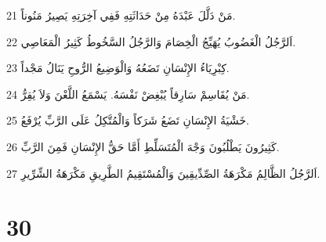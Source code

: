 \par 21 مَنْ دَلَّلَ عَبْدَهُ مِنْ حَدَاثَتِهِ فَفِي آخِرَتِهِ يَصِيرُ مَنُوناً.
\par 22 اَلرَّجُلُ الْغَضُوبُ يُهَيِّجُ الْخِصَامَ وَالرَّجُلُ السَّخُوطُ كَثِيرُ الْمَعَاصِي.
\par 23 كِبْرِيَاءُ الإِنْسَانِ تَضَعُهُ وَالْوَضِيعُ الرُّوحِ يَنَالُ مَجْداً.
\par 24 مَنْ يُقَاسِمْ سَارِقاً يُبْغِضْ نَفْسَهُ. يَسْمَعُ اللَّعْنَ وَلاَ يُقِرُّ.
\par 25 خَشْيَةُ الإِنْسَانِ تَضَعُ شَرَكاً وَالْمُتَّكِلُ عَلَى الرَّبِّ يُرْفَعُ.
\par 26 كَثِيرُونَ يَطْلُبُونَ وَجْهَ الْمُتَسَلِّطِ أَمَّا حَقُّ الإِنْسَانِ فَمِنَ الرَّبِّ.
\par 27 اَلرَّجُلُ الظَّالِمُ مَكْرَهَةُ الصِّدِّيقِينَ وَالْمُسْتَقِيمُ الطَّرِيقِ مَكْرَهَةُ الشِّرِّيرِ.

\chapter{30}

